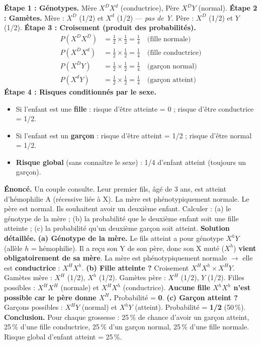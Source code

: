 \documentclass[11pt]{article}
\begin{document}
\begin{methode}
\textbf{Étape 1 : Génotypes.} Mère $X^{D}X^{d}$ (conductrice), Père $X^{D}Y$ (normal).
\textbf{Étape 2 : Gamètes.}
Mère : $X^{D}$ (1/2) et $X^{d}$ (1/2) — \emph{pas de Y}.
Père : $X^{D}$ (1/2) et $Y$ (1/2).
\textbf{Étape 3 : Croisement (produit des probabilités).}
\begin{align*}
P(X^{D}X^{D}) &= \tfrac{1}{2} \times \tfrac{1}{2} = \tfrac{1}{4} \quad \text{(fille normale)} \\
P(X^{D}X^{d}) &= \tfrac{1}{2} \times \tfrac{1}{2} = \tfrac{1}{4} \quad \text{(fille conductrice)} \\
P(X^{D}Y) &= \tfrac{1}{2} \times \tfrac{1}{2} = \tfrac{1}{4} \quad \text{(garçon normal)} \\
P(X^{d}Y) &= \tfrac{1}{2} \times \tfrac{1}{2} = \tfrac{1}{4} \quad \text{(garçon atteint)}
\end{align*}
\textbf{Étape 4 : Risques conditionnés par le sexe.}
\begin{itemize}
\item Si l'enfant est une \textbf{fille} : risque d'être atteinte = 0 ; risque d'être conductrice = 1/2.
\item Si l'enfant est un \textbf{garçon} : risque d'être atteint = 1/2 ; risque d'être normal = 1/2.
\item \textbf{Risque global} (sans connaître le sexe) : 1/4 d'enfant atteint (toujours un garçon).
\end{itemize}
\end{methode}

\begin{exoresolu}
\textbf{Énoncé.} Un couple consulte. Leur premier fils, âgé de 3 ans, est atteint d'hémophilie A (récessive liée à X). La mère est phénotypiquement normale. Le père est normal. Ils souhaitent avoir un deuxième enfant. Calculer : (a) le génotype de la mère ; (b) la probabilité que le deuxième enfant soit une fille atteinte ; (c) la probabilité qu'un deuxième garçon soit atteint.
\tcblower
\textbf{Solution détaillée.}
\textbf{(a) Génotype de la mère.} Le fils atteint a pour génotype $X^{h}Y$ (allèle $h$ = hémophilie). Il a reçu son Y de son père, donc son X muté ($X^{h}$) \textbf{vient obligatoirement de sa mère}. La mère est phénotypiquement normale $\to$ elle est \textbf{conductrice} : $X^{H}X^{h}$.
\textbf{(b) Fille atteinte ?} Croisement $X^{H}X^{h} \times X^{H}Y$.
Gamètes mère : $X^{H}$ (1/2), $X^{h}$ (1/2). Gamètes père : $X^{H}$ (1/2), $Y$ (1/2).
Filles possibles : $X^{H}X^{H}$ (normale) et $X^{H}X^{h}$ (conductrice). \textbf{Aucune fille $X^{h}X^{h}$ n'est possible car le père donne $X^{H}$.} Probabilité = \textbf{0}.
\textbf{(c) Garçon atteint ?} Garçons possibles : $X^{H}Y$ (normal) et $X^{h}Y$ (atteint). Probabilité = \textbf{1/2} (50\,\%).
\textbf{Conclusion.} Pour chaque grossesse : 25\,\% de chance d'avoir un garçon atteint, 25\,\% d'une fille conductrice, 25\,\% d'un garçon normal, 25\,\% d'une fille normale. Risque global d'enfant atteint = 25\,\%.
\end{exoresolu}
\end{document}
